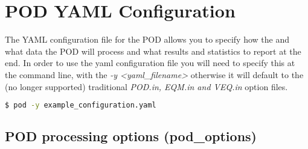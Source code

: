\chapter{POD YAML Configuration}
\label{ch:pod_yaml_configuration}
The YAML configuration file for the POD allows you to specify how the and what data the POD will process and what results and statistics to report at the end.
In order to use the yaml configuration file you will need to specify this at the command line, with the \emph{-y <yaml\_filename>} otherwise it will default to the (no longer supported) traditional \emph{POD.in, EQM.in and VEQ.in} option files.

\begin{lstlisting}[language=bash,caption=calling the yaml configuration file]
$ pod -y example_configuration.yaml
\end{lstlisting}

\section{POD processing options (pod\_options)}
%

